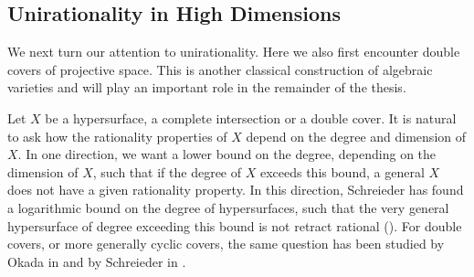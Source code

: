 \subsection{Unirationality in High Dimensions}
We next turn our attention to unirationality. Here we also first encounter double covers of projective space. This is another classical construction of algebraic varieties and will play an important role in the remainder of the thesis.

Let $X$ be a hypersurface, a complete intersection or a double cover. It is natural to ask how the rationality properties of $X$ depend on the degree and dimension of $X$. In one direction, we want a lower bound on the degree, depending on the dimension of $X$, such that if the degree of $X$ exceeds this bound, a general $X$ does not have a given rationality property. In this direction, Schreieder has found a logarithmic bound on the degree of hypersurfaces, such that the very general hypersurface of degree exceeding this bound is not retract rational (\cite{SchreiederHypersurface}). For double covers, or more generally cyclic covers, the same question has been studied by Okada in \cite{OkadaCyclicCovers} and by Schreieder in \cite[Theorem 9.1]{SchreiederHypersurface}.


